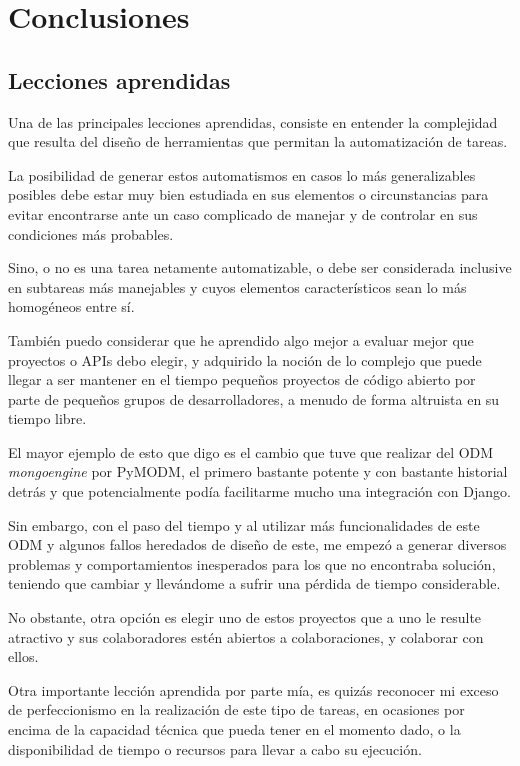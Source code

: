 \cleardoublepage
\chapter{Conclusiones}
\label{chap:conclusiones}

\section{Lecciones aprendidas}

Una de las principales lecciones aprendidas, consiste en entender la complejidad que resulta del diseño de herramientas que permitan la automatización de tareas.


La posibilidad de generar estos automatismos en casos lo más generalizables posibles debe estar muy bien estudiada en sus elementos o circunstancias para evitar encontrarse ante un caso complicado de manejar y de controlar en sus condiciones más probables.


Sino, o no es una tarea netamente automatizable, o debe ser considerada inclusive en subtareas más manejables y cuyos elementos característicos sean lo más homogéneos entre sí.


También puedo considerar que he aprendido algo mejor a evaluar mejor que proyectos o APIs debo elegir, y adquirido la noción de lo complejo que puede llegar a ser mantener en el tiempo pequeños proyectos de código abierto por parte de pequeños grupos de desarrolladores, a menudo de forma altruista en su tiempo libre.


El mayor ejemplo de esto que digo es el cambio que tuve que realizar del ODM \textit{mongoengine} por PyMODM, el primero bastante potente y con bastante historial detrás y que potencialmente podía facilitarme mucho una integración con Django.


Sin embargo, con el paso del tiempo y al utilizar más funcionalidades de este ODM y algunos fallos heredados de diseño de este, me empezó a generar diversos problemas y comportamientos inesperados para los que no encontraba solución, teniendo que cambiar y llevándome a sufrir una pérdida de tiempo considerable.


No obstante, otra opción es elegir uno de estos proyectos que a uno le resulte atractivo y sus colaboradores estén abiertos a colaboraciones, y colaborar con ellos.


Otra importante lección aprendida por parte mía, es quizás reconocer mi exceso de perfeccionismo en la realización de este tipo de tareas, en ocasiones por encima de la capacidad técnica que pueda tener en el momento dado, o la disponibilidad de tiempo o recursos para llevar a cabo su ejecución.


